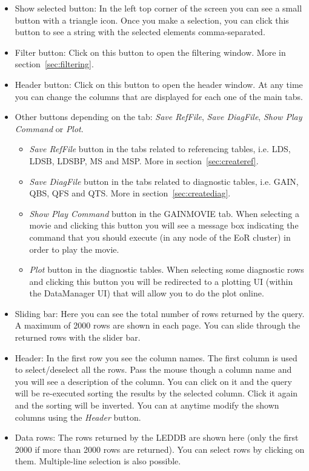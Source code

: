 \documentclass[a4paper,11pt]{article}
\begin{document}
\begin{itemize}
	\item Show selected button: In the left top corner of the screen you can see a small button with a triangle icon. Once you make a selection, you can click this button to see a string with the selected elements comma-separated.
	
	\item Filter button: Click on this button to open the filtering window. More in section~\ref{sec:filtering}.
	
	\item Header button: Click on this button to open the header window. At any time you can change the columns that are displayed for each one of the main tabs.
	
	\item Other buttons depending on the tab: \textit{Save RefFile}, \textit{Save DiagFile}, \textit{Show Play Command} or \textit{Plot}.

	\begin{itemize}
		\item \textit{Save RefFile} button in the tabs related to referencing tables, i.e. LDS, LDSB, LDSBP, MS and MSP. More in section~\ref{sec:createref}.
		\item \textit{Save DiagFile} button in the tabs related to diagnostic tables, i.e. GAIN, QBS, QFS and QTS. More in section~\ref{sec:creatediag}.
		\item \textit{Show Play Command} button in the GAINMOVIE tab. When selecting a movie and clicking this button you will see a message box indicating the command that you should execute (in any node of the EoR cluster) in order to play the movie.
		\item \textit{Plot} button in the diagnostic tables. When selecting some diagnostic rows and clicking this button you will be redirected to a plotting UI (within the DataManager UI) that will allow you to do the plot online.
	\end{itemize}

	\item Sliding bar: Here you can see the total number of rows returned by the query. A maximum of 2000 rows are shown in each page. You can slide through the returned rows with the slider bar.
	
	\item Header: In the first row you see the column names. The first column is used to select/deselect all the rows. Pass the mouse though a column name and you will see a description of the column. You can click on it and the query will be re-executed sorting the results by the selected column. Click it again and the sorting will be inverted. You can at anytime modify the shown columns using the \textit{Header} button.
	
	\item Data rows: The rows returned by the LEDDB are shown here (only the first 2000 if more than 2000 rows are returned). You can select rows by clicking on them. Multiple-line selection is also possible.
\end{itemize}
\end{document}
